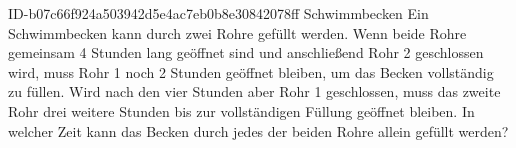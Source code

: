 \begin{exercise}
      {ID-b07c66f924a503942d5e4ac7eb0b8e30842078ff}
      {Schwimmbecken}
  \ifproblem\problem
    Ein Schwimmbecken kann durch zwei Rohre gefüllt werden. Wenn beide Rohre
    gemeinsam 4 Stunden lang geöffnet sind und anschließend Rohr 2 geschlossen
    wird, muss Rohr 1 noch 2 Stunden geöffnet bleiben, um das Becken vollständig
    zu füllen. Wird nach den vier Stunden aber Rohr 1 geschlossen, muss das zweite
    Rohr drei weitere Stunden bis zur vollständigen Füllung geöffnet bleiben.
    In welcher Zeit kann das Becken durch jedes der beiden Rohre allein gefüllt
    werden?
  \fi
\end{exercise}

